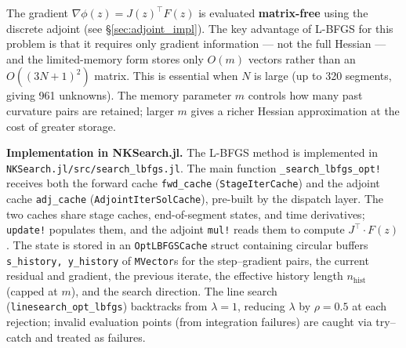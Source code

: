 \documentclass[11pt,a4paper]{article}
\begin{document}
The gradient $\nabla\phi(z) = J(z)^\top F(z)$ is evaluated
\textbf{matrix-free} using the discrete adjoint (see \S\ref{sec:adjoint_impl}).
The key advantage of L-BFGS for this problem is that it requires only
gradient information --- not the full Hessian --- and the
limited-memory form stores only $O(m)$ vectors rather than an
$O((3N+1)^2)$ matrix.  This is essential when $N$ is large (up to 320
segments, giving 961 unknowns).  The memory parameter $m$ controls how
many past curvature pairs are retained; larger $m$ gives a richer Hessian
approximation at the cost of greater storage.

\textbf{Implementation in NKSearch.jl.}
The L-BFGS method is implemented in \texttt{NKSearch.jl/src/search\_lbfgs.jl}.
The main function \texttt{\_search\_lbfgs\_opt!} receives both the forward
cache \texttt{fwd\_cache} (\texttt{StageIterCache}) and the adjoint cache
\texttt{adj\_cache} (\texttt{AdjointIterSolCache}), pre-built by the dispatch
layer.  The two caches share stage caches, end-of-segment states, and time
derivatives; \texttt{update!} populates them, and the adjoint \texttt{mul!}
reads them to compute $J^\top \cdot F(z)$.  The state is stored in an
\texttt{OptLBFGSCache} struct containing circular buffers
\texttt{s\_history, y\_history} of \texttt{MVector}s for the step--gradient
pairs, the current residual and gradient, the previous iterate, the effective
history length $n_{\text{hist}}$ (capped at $m$), and the search direction.
The line search (\texttt{linesearch\_opt\_lbfgs}) backtracks from $\lambda=1$,
reducing $\lambda$ by $\rho=0.5$ at each rejection; invalid evaluation points
(from integration failures) are caught via try--catch and treated as failures.
\end{document}
